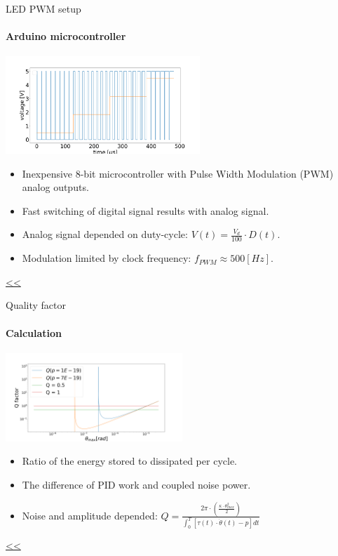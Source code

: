 \documentclass{beamer}
\begin{document}
\begin{frame}{\hypertarget{frame:LED PWM setup 1}{LED PWM setup}}
	\framesubtitle{Arduino microcontroller}
	\begin{center}		
		\includegraphics[width=0.55\textwidth,keepaspectratio]{duty_cycle.png}
	\end{center}
	\begin{itemize}		
		\item Inexpensive 8-bit microcontroller with Pulse Width Modulation (PWM) analog outputs.
		\item Fast switching of digital signal results with analog signal.
		\item Analog signal depended on duty-cycle: $V(t) =  \frac{V_d}{100}\cdot D(t)$.
		\item Modulation limited by clock frequency: $f_{PWM} \approx 500[Hz]$.
	\end{itemize}
	\hyperlink{frame:LED PWM setup}{<<} 
\end{frame}

\begin{frame}{\hypertarget{frame:Quality factor 1}{Quality factor}}
	\framesubtitle{Calculation}
	\begin{center}		
		\includegraphics[width=0.5\textwidth,keepaspectratio]{Q factor.png}
	\end{center}
	\begin{itemize}			
		\item Ratio of the energy stored to dissipated per cycle.
		\item The difference of PID work and coupled noise power. 
		\item Noise and amplitude depended: $Q =  \frac{2\pi\cdot(\frac{\kappa\cdot\theta_{max}^2}{2})}{\int_0^T[\tau(t)\cdot\dot{\theta}(t) - p]dt} $
					
	\end{itemize}
	\hyperlink{frame:Quality factor}{<<} 

\end{frame}
\end{document}
